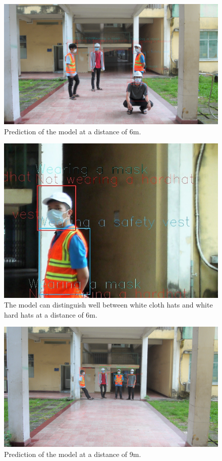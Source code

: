 \documentclass[conference]{IEEEtran}
\begin{document}
\begin{figure}[ht]
	\centerline{\includegraphics[scale=0.08]{images/good_hh_6m.jpg}}
  	\caption{Prediction of the model at a distance of 6m.}
  	\label{fig:good_hh_6m}
\end{figure}
\begin{figure}[ht]
	\centerline{\includegraphics[scale=0.3]{images/good_hh_6m_zoom.jpg}}
  	\caption{The model can distinguish well between white cloth hats and white hard hats at a distance of 6m.}
  	\label{fig:good_hh_6m_zoom}
\end{figure}
\begin{figure}[ht]
	\centerline{\includegraphics[scale=0.08]{images/bad_hh_9m.jpg}}
  	\caption{Prediction of the model at a distance of 9m.}
  	\label{fig:good_hh_9m}
\end{figure}
\end{document}
